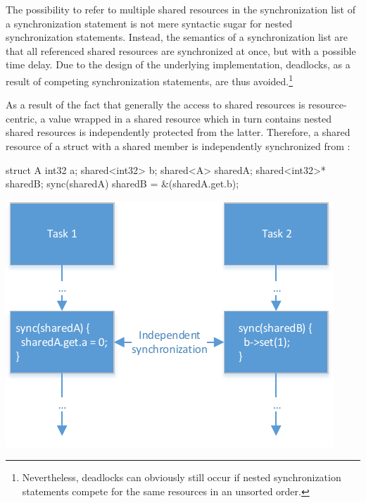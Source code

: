 The possibility to refer to multiple shared resources in the synchronization list of a synchronization statement is not mere syntactic sugar for nested synchronization statements. Instead, the semantics of a synchronization list are that all referenced shared resources are synchronized at once, but with a possible time delay. Due to the design of the underlying implementation, deadlocks, as a result of competing synchronization statements, are thus avoided.\footnote{Nevertheless, deadlocks can obviously still occur if nested synchronization statements compete for the same resources in an unsorted order.}

As a result of the fact that generally the access to shared resources is resource-centric, a value wrapped in a shared resource which in turn contains nested shared resources is independently protected from the latter. Therefore, a shared resource of a struct with a shared member  is independently synchronized from :

\vspace{0.5cm}
\begin{minipage}{0.35\textwidth}
\begin{ccode}
struct A {
  int32 a;
  shared<int32> b; 
}
shared<A> sharedA;
shared<int32>* sharedB;
sync(sharedA) { sharedB = &(sharedA.get.b); }
\end{ccode}
\end{minipage}
\begin{minipage}{0.2\textwidth}
\begin{center}
\end{center}
\end{minipage}
\begin{minipage}{0.35\textwidth}
\includegraphics[scale=.9]{pics/ParallelExecution}
\end{minipage}

